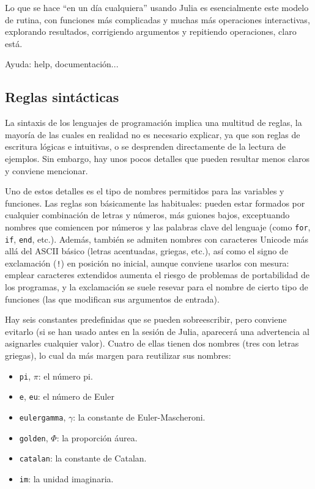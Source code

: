 ﻿\documentclass{article}
\newcommand{\code}{\texttt}
\begin{document}
Lo que se hace ``en un día cualquiera'' usando Julia es esencialmente este modelo de rutina, con funciones más complicadas y muchas más operaciones interactivas, explorando resultados, corrigiendo argumentos y repitiendo operaciones, claro está.

Ayuda: help, documentación...

\subsection{Reglas sintácticas}

La sintaxis de los lenguajes de programación implica una multitud de reglas, la mayoría de las cuales en realidad no es necesario explicar, ya que son reglas de escritura lógicas e intuitivas, o se desprenden directamente de la lectura de ejemplos. Sin embargo, hay unos pocos detalles que pueden resultar menos claros y conviene mencionar.

Uno de estos detalles es el tipo de nombres permitidos para las variables y funciones. Las reglas son básicamente las habituales: pueden estar formados por cualquier combinación de letras y números, más guiones bajos, exceptuando nombres que comiencen por números y las palabras clave del lenguaje (como \code{for}, \code{if}, \code{end}, etc.). Además, también se admiten nombres con caracteres Unicode más allá del ASCII básico (letras acentuadas, griegas, etc.), así como el signo de exclamación (\code{!}) en posición no inicial, aunque conviene usarlos con mesura: emplear caracteres extendidos aumenta el riesgo de problemas de portabilidad de los programas, y la exclamación se suele resevar para el nombre de cierto tipo de funciones (las que modifican sus argumentos de entrada).

Hay seis constantes predefinidas que se pueden sobreescribir, pero conviene evitarlo (si se han usado antes en la sesión de Julia, aparecerá una advertencia al asignarles cualquier valor). Cuatro de ellas tienen dos nombres (tres con letras griegas), lo cual da más margen para reutilizar sus nombres:

\begin{itemize}
  \item \code{pi}, \code{$\pi$}: el número pi.
  \item \code{e}, \code{eu}: el número de Euler
  \item \code{eulergamma}, \code{$\gamma$}: la constante de Euler-Mascheroni.
  \item \code{golden}, \code{$\Phi$}: la proporción áurea.
  \item \code{catalan}: la constante de Catalan.
  \item \code{im}: la unidad imaginaria.
\end{itemize}
\end{document}
